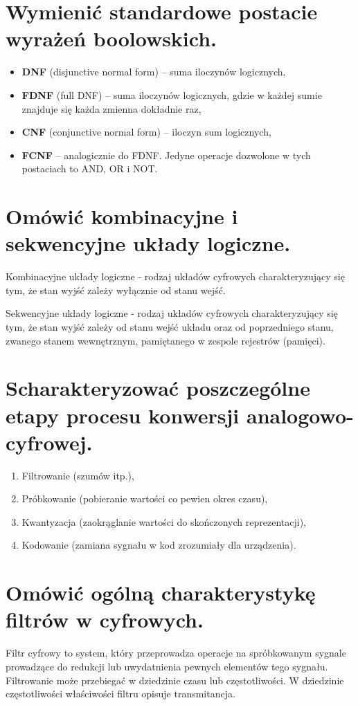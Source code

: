 \documentclass[12pt,a4paper]{article}
\begin{document}
	\section{Wymienić standardowe postacie wyrażeń boolowskich.}
	\begin{itemize}
		\item \textbf{DNF} (disjunctive normal form) -- suma iloczynów logicznych,
		\item \textbf{FDNF} (full DNF) -- suma iloczynów logicznych, gdzie w każdej sumie znajduje się każda zmienna dokładnie raz,
		\item \textbf{CNF} (conjunctive normal form) -- iloczyn sum logicznych,
		\item \textbf{FCNF} -- analogicznie do FDNF. Jedyne operacje dozwolone w tych postaciach to AND, OR i NOT.
	\end{itemize}

	\section{Omówić kombinacyjne i sekwencyjne układy logiczne.}
	Kombinacyjne układy logiczne - rodzaj układów cyfrowych charakteryzujący się tym, że stan wyjść zależy wyłącznie od stanu wejść.

	Sekwencyjne układy logiczne - rodzaj układów cyfrowych charakteryzujący się tym, że stan wyjść zależy od stanu wejść układu oraz od poprzedniego stanu, zwanego stanem wewnętrznym, pamiętanego w zespole rejestrów (pamięci).

	\section{Scharakteryzować poszczególne etapy procesu konwersji analogowo-cyfrowej.}
	\begin{enumerate}
		\item Filtrowanie (szumów itp.),
		\item Próbkowanie (pobieranie wartości co pewien okres czasu),
		\item Kwantyzacja (zaokrąglanie wartości do skończonych reprezentacji),
		\item Kodowanie (zamiana sygnału w kod zrozumiały dla urządzenia).
	\end{enumerate}

	\section{Omówić ogólną charakterystykę filtrów w cyfrowych.}
	Filtr cyfrowy to system, który przeprowadza operacje na spróbkowanym sygnale prowadzące do redukcji lub uwydatnienia pewnych elementów tego sygnału. Filtrowanie może przebiegać w dziedzinie czasu lub częstotliwości. W dziedzinie częstotliwości właściwości filtru opisuje transmitancja.
\end{document}
